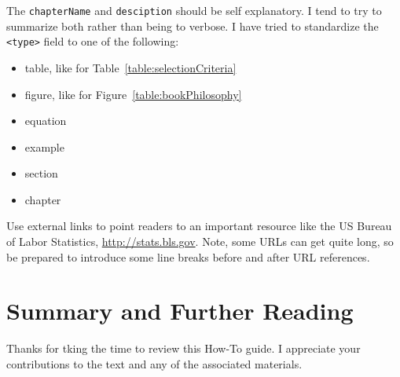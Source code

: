The \verb+chapterName+ and \verb+desciption+ should be self explanatory.  I tend to 
try to summarize both rather than being to verbose.  I have tried to standardize the 
\verb+<type>+ field to one of the following:
\begin{itemize}
\item  table, like for Table~\ref{table:selectionCriteria}
\item  figure, like for Figure~\ref{table:bookPhilosophy}
\item equation
\item example
\item section
\item chapter
\end{itemize}

Use external links to point readers to an important resource like the US Bureau of Labor Statistics, 
\url{http://stats.bls.gov}. Note, some URLs can get quite long, so be prepared to introduce some line 
breaks before and after URL references.

\section{Summary and Further Reading}
\label{section:summary-and-further-reading}
Thanks for tking the time to review this How-To guide.  I appreciate your contributions to the text and any of the 
associated materials.
